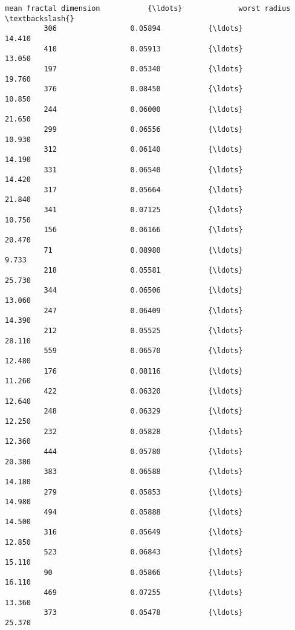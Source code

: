 \documentclass[11pt]{article}
\begin{document}
\begin{Verbatim}[commandchars=\\\{\}]
              mean fractal dimension           {\ldots}             worst radius  \textbackslash{}
         306                 0.05894           {\ldots}                   14.410   
         410                 0.05913           {\ldots}                   13.050   
         197                 0.05340           {\ldots}                   19.760   
         376                 0.08450           {\ldots}                   10.850   
         244                 0.06000           {\ldots}                   21.650   
         299                 0.06556           {\ldots}                   10.930   
         312                 0.06140           {\ldots}                   14.190   
         331                 0.06540           {\ldots}                   14.420   
         317                 0.05664           {\ldots}                   21.840   
         341                 0.07125           {\ldots}                   10.750   
         156                 0.06166           {\ldots}                   20.470   
         71                  0.08980           {\ldots}                    9.733   
         218                 0.05581           {\ldots}                   25.730   
         344                 0.06506           {\ldots}                   13.060   
         247                 0.06409           {\ldots}                   14.390   
         212                 0.05525           {\ldots}                   28.110   
         559                 0.06570           {\ldots}                   12.480   
         176                 0.08116           {\ldots}                   11.260   
         422                 0.06320           {\ldots}                   12.640   
         248                 0.06329           {\ldots}                   12.250   
         232                 0.05828           {\ldots}                   12.360   
         444                 0.05780           {\ldots}                   20.380   
         383                 0.06588           {\ldots}                   14.180   
         279                 0.05853           {\ldots}                   14.980   
         494                 0.05888           {\ldots}                   14.500   
         316                 0.05649           {\ldots}                   12.850   
         523                 0.06843           {\ldots}                   15.110   
         90                  0.05866           {\ldots}                   16.110   
         469                 0.07255           {\ldots}                   13.360   
         373                 0.05478           {\ldots}                   25.370   

\end{Verbatim}
\end{document}
